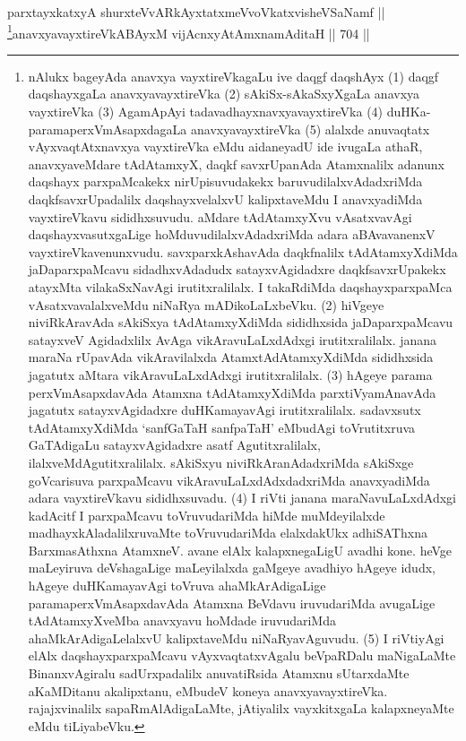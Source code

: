 \begin{shl}
parxtayxkatxyA shurxteVvARkAyxtatxmeVvoVkatxvisheVSaNamf ||  \\
\footnote{nAlukx bageyAda anavxya vayxtireVkagaLu ive \ndash  daqgf 
daqshAyx (1) daqgf daqshayxgaLa anavxyavayxtireVka (2) 
sAkiSx-sAkaSxyXgaLa anavxya vayxtireVka (3) AgamApAyi 
tadavadhayxnavxyavayxtireVka (4) duHKa-paramaperxVmAsapxdagaLa 
anavxyavayxtireVka (5) alalxde anuvaqtatx vAyxvaqtAtxnavxya 
vayxtireVka eMdu aidaneyadU ide \ndash 
ivugaLa athaR, anavxyaveMdare tAdAtamxyX, daqkf savxrUpanAda 
Atamxnalilx adanunx daqshayx parxpaMcakekx nirUpisuvudakekx 
baruvudilalxvAdadxriMda daqkfsavxrUpadalilx daqshayxvelalxvU 
kalipxtaveMdu I anavxyadiMda vayxtireVkavu sididhxsuvudu. aMdare 
tAdAtamxyXvu vAsatxvavAgi daqshayxvasutxgaLige 
hoMduvudilalxvAdadxriMda adara aBAvavanenxV vayxtireVkavenunxvudu. 
savxparxkAshavAda daqkfnalilx tAdAtamxyXdiMda jaDaparxpaMcavu 
sidadhxvAdadudx satayxvAgidadxre daqkfsavxrUpakekx atayxMta 
vilakaSxNavAgi irutitxralilalx. I takaRdiMda daqshayxparxpaMca 
vAsatxvavalalxveMdu niNaRya mADikoLaLxbeVku. (2) hiVgeye niviRkAravAda 
sAkiSxya tAdAtamxyXdiMda sididhxsida jaDaparxpaMcavu satayxveV 
Agidadxlilx AvAga vikAravuLaLxdAdxgi irutitxralilalx. janana maraNa 
rUpavAda vikAravilalxda AtamxtAdAtamxyXdiMda sididhxsida jagatutx 
aMtara vikAravuLaLxdAdxgi irutitxralilalx. (3) hAgeye parama 
perxVmAsapxdavAda Atamxna tAdAtamxyXdiMda parxtiVyamAnavAda jagatutx 
satayxvAgidadxre duHKamayavAgi irutitxralilalx. sadavxsutx 
tAdAtamxyXdiMda `sanfGaTaH sanfpaTaH' eMbudAgi toVrutitxruva 
GaTAdigaLu satayxvAgidadxre asatf Agutitxralilalx, 
ilalxveMdAgutitxralilalx. sAkiSxyu niviRkAranAdadxriMda sAkiSxge 
goVcarisuva parxpaMcavu vikAravuLaLxdAdxdadxriMda anavxyadiMda adara 
vayxtireVkavu sididhxsuvadu. (4) I riVti janana maraNavuLaLxdAdxgi 
kadAcitf I parxpaMcavu toVruvudariMda hiMde muMdeyilalxde 
madhayxkAladalilxruvaMte toVruvudariMda elalxdakUkx adhiSAThxna 
BarxmasAthxna AtamxneV. avane elAlx kalapxnegaLigU avadhi kone. heVge 
maLeyiruva deVshagaLige maLeyilalxda gaMgeye avadhiyo hAgeye idudx, 
hAgeye duHKamayavAgi toVruva ahaMkArAdigaLige paramaperxVmAsapxdavAda 
Atamxna BeVdavu iruvudariMda avugaLige tAdAtamxyXveMba anavxyavu 
hoMdade iruvudariMda ahaMkArAdigaLelalxvU kalipxtaveMdu 
niNaRyavAguvudu. (5) I riVtiyAgi elAlx daqshayxparxpaMcavu 
vAyxvaqtatxvAgalu beVpaRDalu maNigaLaMte BinanxvAgiralu sadUrxpadalilx 
anuvatiRsida Atamxnu sUtarxdaMte aKaMDitanu akalipxtanu, eMbudeV 
koneya anavxyavayxtireVka. rajajxvinalilx sapaRmAlAdigaLaMte, 
jAtiyalilx vayxkitxgaLa kalapxneyaMte eMdu tiLiyabeVku.}anavxyavayxtireVkABAyxM vijAcnxyA\s \s tAmxnamAditaH \hfill || 704 ||  
\end{shl}


